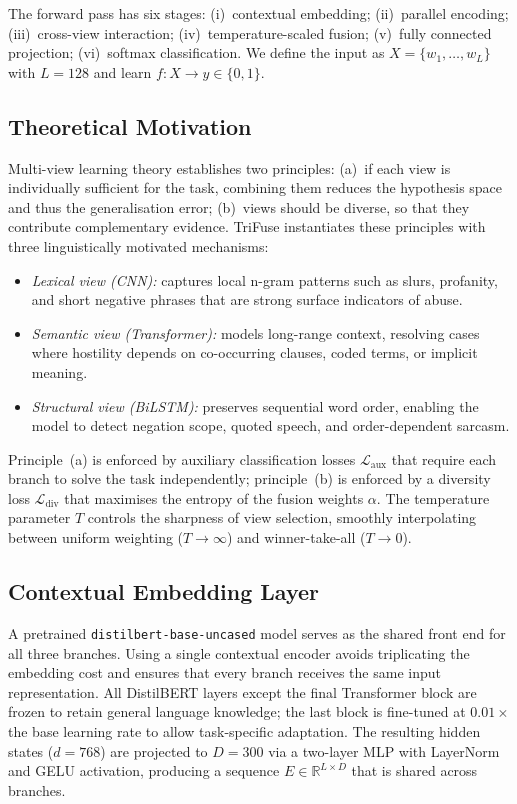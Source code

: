 \documentclass[10pt,twocolumn,a4paper]{article}
\begin{document}
The forward pass has six stages: (i)~contextual embedding; (ii)~parallel encoding; (iii)~cross-view interaction; (iv)~temperature-scaled fusion; (v)~fully connected projection; (vi)~softmax classification. We define the input as $X = \{w_1, \ldots, w_L\}$ with $L{=}128$ and learn $f: X \rightarrow y \in \{0,1\}$.

\subsection{Theoretical Motivation}\label{subsec:motivation}

Multi-view learning theory \citep{ref19} establishes two principles: (a)~if each view is individually sufficient for the task, combining them reduces the hypothesis space and thus the generalisation error; (b)~views should be diverse, so that they contribute complementary evidence. TriFuse instantiates these principles with three linguistically motivated mechanisms:
\begin{itemize}
\item \emph{Lexical view (CNN):} captures local n-gram patterns such as slurs, profanity, and short negative phrases that are strong surface indicators of abuse.
\item \emph{Semantic view (Transformer):} models long-range context, resolving cases where hostility depends on co-occurring clauses, coded terms, or implicit meaning.
\item \emph{Structural view (BiLSTM):} preserves sequential word order, enabling the model to detect negation scope, quoted speech, and order-dependent sarcasm.
\end{itemize}
Principle~(a) is enforced by auxiliary classification losses $\mathcal{L}_{\mathrm{aux}}$ that require each branch to solve the task independently; principle~(b) is enforced by a diversity loss $\mathcal{L}_{\mathrm{div}}$ that maximises the entropy of the fusion weights $\alpha$. The temperature parameter $T$ controls the sharpness of view selection, smoothly interpolating between uniform weighting ($T \to \infty$) and winner-take-all ($T \to 0$).

\subsection{Contextual Embedding Layer}\label{subsec:embedding}

A pretrained \texttt{distilbert-base-uncased} model serves as the shared front end for all three branches. Using a single contextual encoder avoids triplicating the embedding cost and ensures that every branch receives the same input representation. All DistilBERT layers except the final Transformer block are frozen to retain general language knowledge; the last block is fine-tuned at $0.01\times$ the base learning rate to allow task-specific adaptation. The resulting hidden states ($d{=}768$) are projected to $D{=}300$ via a two-layer MLP with LayerNorm and GELU activation, producing a sequence $E \in \mathbb{R}^{L \times D}$ that is shared across branches.
\end{document}
